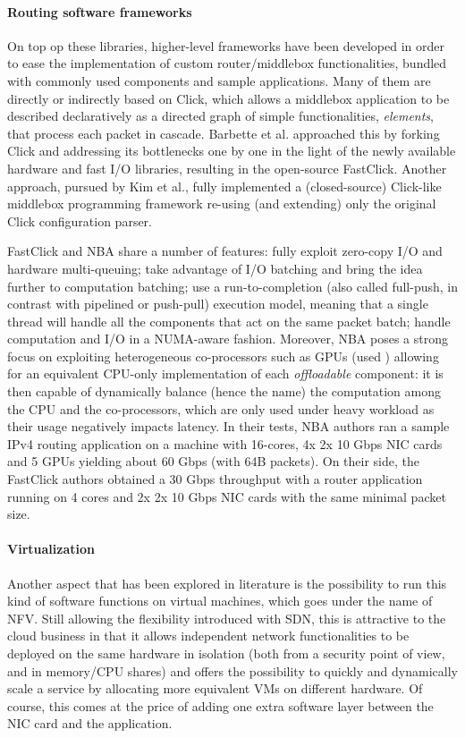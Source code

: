 \documentclass[12pt,a4paper,twoside]{book}
\begin{document}
\paragraph{Routing software frameworks} On top op these libraries, higher-level frameworks have been developed in order to ease the implementation of custom router/middlebox functionalities, bundled with commonly used components and sample applications. Many of them are directly or indirectly based on Click\cite{click}, which allows a middlebox application to be described declaratively as a directed graph of simple functionalities, \emph{elements}, that process each packet in cascade.
Barbette et al.\cite{fastclick} approached this by forking Click and addressing its bottlenecks one by one in the light of the newly available hardware and fast I/O libraries, resulting in the open-source FastClick. Another approach, pursued by Kim et al.\cite{nba}, fully implemented a (closed-source) Click-like middlebox programming framework re-using (and extending) only the original Click configuration parser.

FastClick and NBA share a number of features:
fully exploit zero-copy I/O and hardware multi-queuing;
take advantage of I/O batching and bring the idea further to computation batching;
use a run-to-completion (also called full-push, in contrast with pipelined or push-pull) execution model, meaning that a single thread will handle all the components that act on the same packet batch;
handle computation and I/O in a NUMA-aware fashion.
Moreover, NBA poses a strong focus on exploiting heterogeneous co-processors such as GPUs (used ) allowing for an equivalent CPU-only implementation of each \emph{offloadable} component: it is then capable of dynamically balance (hence the name) the computation among the CPU and the co-processors, which are only used under heavy workload as their usage negatively impacts latency. In their tests, NBA authors ran a sample IPv4 routing application on a machine with 16-cores, 4x 2x 10 Gbps NIC cards and 5 GPUs yielding about 60 Gbps (with 64B packets). On their side, the FastClick authors obtained a 30 Gbps throughput with a router application running on 4 cores and 2x 2x 10 Gbps NIC cards with the same minimal packet size. 


\paragraph{Virtualization} Another aspect that has been explored in literature is the possibility to run this kind of software functions on virtual machines, which goes under the name of \acrfull{NFV}.
Still allowing the flexibility introduced with \gls{SDN}, this is attractive to the cloud business in that it allows independent network functionalities to be deployed on the same hardware in isolation (both from a security point of view, and in memory/CPU shares) and offers the possibility to quickly and dynamically scale a service by allocating more equivalent VMs on different hardware. Of course, this comes at the price of adding one extra software layer between the NIC card and the application.
\end{document}

